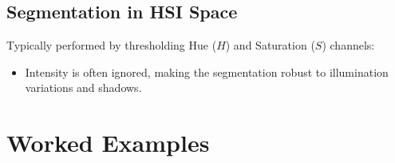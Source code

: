 \documentclass[12pt,a4paper]{article}
\begin{document}
\subsection{Segmentation in HSI Space}
Typically performed by thresholding Hue ($H$) and Saturation ($S$) channels:
\begin{itemize}[leftmargin=*, itemsep=2pt]
  \item Intensity is often ignored, making the segmentation robust to illumination variations and shadows.
\end{itemize}

\section{Worked Examples}
\end{document}
